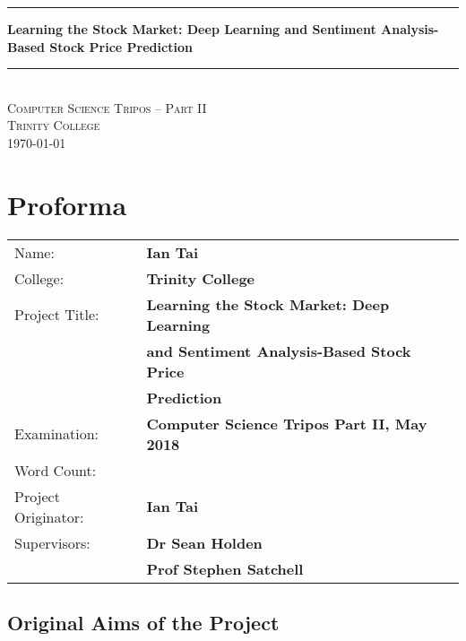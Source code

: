 \documentclass[12pt,a4paper,twoside,openright]{report}
\begin{document}





\thispagestyle{empty}
\vspace*{50mm}
\begin{center}
\rule{\linewidth}{1pt}\vspace{5mm}
\LARGE\textbf{Learning the Stock Market: Deep Learning and Sentiment
Analysis-Based Stock Price Prediction}
\rule{\linewidth}{1pt} \\[10mm]
\Large\textsc{Computer Science Tripos -- Part II \\[5mm]
Trinity College \\[5mm]
\today}  %
\end{center}

\pagestyle{plain}
\setcounter{page}{1} 
\chapter*{Proforma}
{\large
\begin{tabular}{ll}
Name:               & \bf Ian Tai                      \\[-2pt]
College:            & \bf Trinity College                     \\[-2pt]
Project Title:      & \bf Learning the Stock Market: Deep Learning \\[-2pt]
& \bf and Sentiment Analysis-Based Stock Price\\[-2pt]
& \bf Prediction \\[-3pt]
Examination:        & \bf Computer Science Tripos Part II, May 2018  \\[-2pt]
Word Count:         &   \footnotemark \\[-3pt]
Project Originator: & \bf Ian Tai                    \\[-2pt]
Supervisors:         & \bf Dr Sean Holden                    \\[-2pt]
& \bf Prof Stephen Satchell
\end{tabular}
}



\section*{Original Aims of the Project}
\end{document}
